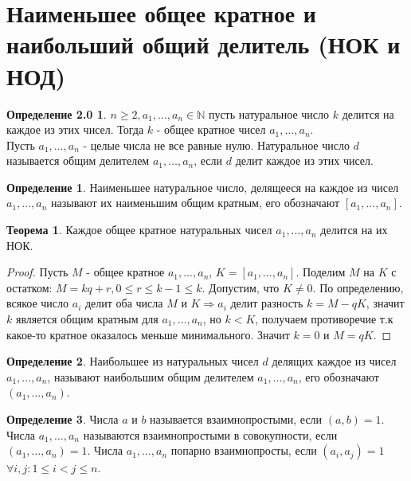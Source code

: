 \documentclass[a4paper, 12pt]{article}
\theoremstyle{definition}
\newtheorem{definition}{Определение}[section]
\newtheorem{theorem}{Теорема}[section]
\newtheorem*{comment}{Замечание}
\newtheorem*{def20}{Определение 2.0}
\begin{document}
    \section{Наименьшее общее кратное и наибольший общий делитель (НОК и НОД)}
    \begin{def20}
         $n\geq 2, a_1, \dots, a_n \in \mathbb{N}$ пусть натуральное число $k$ делится на каждое из этих чисел. Тогда $k$ - общее кратное чисел $a_1, \dots, a_n$. \\
        Пусть $a_1, \dots, a_n$ - целые числа не все равные нулю. Натуральное число $d$ называется общим делителем $a_1, \dots, a_n$, если $d$ делит каждое из этих чисел.
    \end{def20}
    \begin{comment}
        Множество таких $k$ непусто, в нем лежит, например произведение всех этих чисел. \\ Множество таких $d$ конечно: если $a_i\ne 0$, то $d$ находится среди делителей числа $a_i$, (по пункту 6 леммы 1.1) $d\leq |a_i|$, значит числа $d$ образуют конечное множество, оно непусто, так как содержит единицу.
    \end{comment}
    \begin{definition}
        Наименьшее натуральное число, делящееся на каждое из чисел $a_1, \dots, a_n$ называют их наименьшим общим кратным, его обозначают $[a_1, \dots, a_n]$.
    \end{definition}
    \begin{theorem}
        Каждое общее кратное натуральных чисел $a_1, \dots, a_n$ делится на их НОК.
    \end{theorem}
    \begin{proof}
        Пусть $M$ - общее кратное $a_1, \dots, a_n$, $K=[a_1, \dots, a_n]$. Поделим $M$ на $K$ с остатком: $M=kq+r, 0\leq r\leq k-1\leq k$. Допустим, что $K\ne 0$. По определению, всякое число $a_i$ делит оба числа $M$ и $K \Rightarrow a_i$ делит разность $k=M-qK$, значит $k$ является общим кратным для $a_1, \dots, a_n$, но $k<K$, получаем противоречие т.к какое-то кратное оказалось меньше минимального. Значит $k=0$ и $M=qK$.  
    \end{proof}
    \begin{definition}
        Наибольшее из натуральных чисел $d$ делящих каждое из чисел $a_1, \dots, a_n$, называют наибольшим общим делителем $a_1, \dots, a_n$, его обозначают $(a_1, \dots, a_n)$.
    \end{definition}
    \begin{definition}
        Числа $a$ и $b$ называется взаимнопростыми, если $(a,b)=1$. Числа $a_1, \dots, a_n$ называются взаимнопростыми в совокупности, если $(a_1, \dots, a_n)=1$. Числа $a_1, \dots, a_n$ попарно взаимнопросты, если $(a_i,a_j)=1$ $\forall i,j: 1\leq i<j\leq n$.
    \end{definition}
\end{document}

